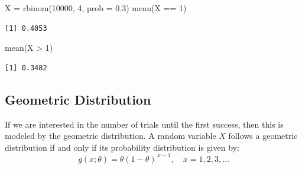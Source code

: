\documentclass[
  letterpaper,
  DIV=11,
  numbers=noendperiod]{scrreprt}
\newenvironment{Shaded}{\begin{snugshade}}{\end{snugshade}}
\newcommand{\AttributeTok}[1]{\textcolor[rgb]{0.40,0.45,0.13}{#1}}
\newcommand{\DecValTok}[1]{\textcolor[rgb]{0.68,0.00,0.00}{#1}}
\newcommand{\FloatTok}[1]{\textcolor[rgb]{0.68,0.00,0.00}{#1}}
\newcommand{\FunctionTok}[1]{\textcolor[rgb]{0.28,0.35,0.67}{#1}}
\newcommand{\NormalTok}[1]{\textcolor[rgb]{0.00,0.23,0.31}{#1}}
\newcommand{\OtherTok}[1]{\textcolor[rgb]{0.00,0.23,0.31}{#1}}
\newcommand{\SpecialCharTok}[1]{\textcolor[rgb]{0.37,0.37,0.37}{#1}}
\begin{document}
\begin{Shaded}
\begin{Highlighting}[]
\NormalTok{X }\OtherTok{=} \FunctionTok{rbinom}\NormalTok{(}\DecValTok{10000}\NormalTok{, }\DecValTok{4}\NormalTok{, }\AttributeTok{prob =} \FloatTok{0.3}\NormalTok{)}
\FunctionTok{mean}\NormalTok{(X }\SpecialCharTok{==} \DecValTok{1}\NormalTok{)}
\end{Highlighting}
\end{Shaded}

\begin{verbatim}
[1] 0.4053
\end{verbatim}

\begin{Shaded}
\begin{Highlighting}[]
\FunctionTok{mean}\NormalTok{(X }\SpecialCharTok{\textgreater{}} \DecValTok{1}\NormalTok{)}
\end{Highlighting}
\end{Shaded}

\begin{verbatim}
[1] 0.3482
\end{verbatim}

\subsection{Geometric Distribution}\label{geometric-distribution}

If we are interested in the number of trials until the first success,
then this is modeled by the geometric distribution. A random variable
\(X\) follows a geometric distribution if and only if its probability
distribution is given by: \[
g(x;\theta) = \theta (1 - \theta)^{\,x-1}, \quad x = 1,2,3,\ldots
\]
\end{document}
